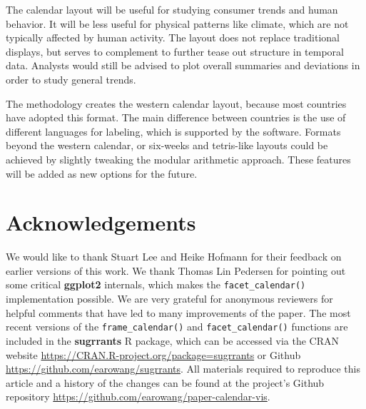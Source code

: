 \documentclass[12pt]{article}
\begin{document}
The calendar layout will be useful for studying consumer trends and human behavior. It will be less useful for physical patterns like climate, which are not typically affected by human activity. The layout does not replace traditional displays, but serves to complement to further tease out structure in temporal data. Analysts would still be advised to plot overall summaries and deviations in order to study general trends.

The methodology creates the western calendar layout, because most countries have adopted this format. The main difference between countries is the use of different languages for labeling, which is supported by the software. Formats beyond the western calendar, or six-weeks and tetris-like layouts could be achieved by slightly tweaking the modular arithmetic approach. These features will be added as new options for the future.

\hypertarget{acknowledgements}{%
\section*{Acknowledgements}\label{acknowledgements}}

We would like to thank Stuart Lee and Heike Hofmann for their feedback on earlier versions of this work. We thank Thomas Lin Pedersen for pointing out some critical \textbf{ggplot2} internals, which makes the \texttt{facet\_calendar()} implementation possible. We are very grateful for anonymous reviewers for helpful comments that have led to many improvements of the paper. The most recent versions of the \texttt{frame\_calendar()} and \texttt{facet\_calendar()} functions are included in the \textbf{sugrrants} R package, which can be accessed via the CRAN website \url{https://CRAN.R-project.org/package=sugrrants} or Github \url{https://github.com/earowang/sugrrants}. All materials required to reproduce this article and a history of the changes can be found at the project's Github repository \url{https://github.com/earowang/paper-calendar-vis}.



\end{document}
